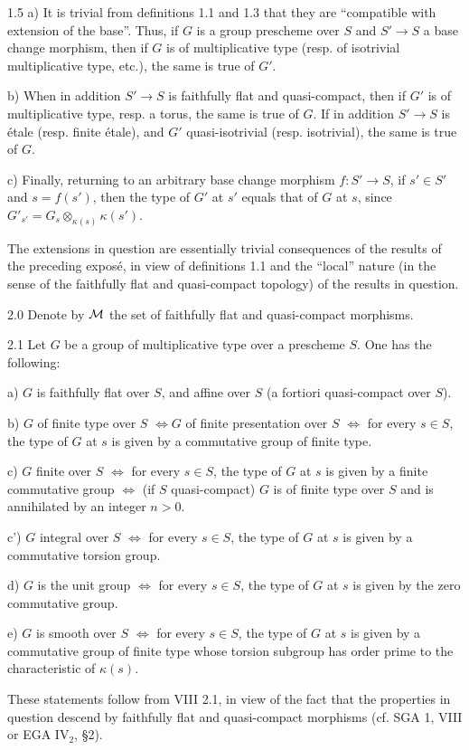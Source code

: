 \begin{remark}{1.5}\label{IX.1.5}
a) It is trivial from definitions 1.1 and 1.3 that they are ``compatible with extension of the base''. Thus, if $G$ is a group prescheme over $S$ and $S'\to S$ a base change morphism, then if $G$ is of multiplicative type (resp. of isotrivial multiplicative type, etc.), the same is true of $G'$.

b) When in addition $S'\to S$ is faithfully flat and quasi-compact, then if $G'$ is of multiplicative type, resp. a torus, the same is true of $G$. If in addition $S'\to S$ is étale (resp. finite étale), and $G'$ quasi-isotrivial (resp. isotrivial), the same is true of $G$.

c) Finally, returning to an arbitrary base change morphism $f:S'\to S$, if $s'\in S'$ and $s=f(s')$, then the type of $G'$ at $s'$ equals that of $G$ at $s$, since $G'_{s'}=G_s\otimes_{\kappa(s)}\kappa(s')$.
\end{remark}

The extensions in question are essentially trivial consequences of the results of the preceding expos\'e, in view of definitions 1.1 and the ``local'' nature (in the sense of the faithfully flat and quasi-compact topology) of the results in question.
\begin{definition}{2.0}\label{IX.2.0}
 Denote by $\cal M$ the set of faithfully flat and quasi-compact morphisms.
\end{definition}
\begin{proposition}{2.1}\label{IX.2.1}
Let $G$ be a group of multiplicative type over a prescheme $S$. One has the following:

a) $G$ is faithfully flat over $S$, and affine over $S$ (a fortiori quasi-compact over $S$).

b) $G$ of finite type over $S$ $\Longleftrightarrow G$ of finite presentation over $S$ $\Longleftrightarrow$ for every $s\in S$, the type of $G$ at $s$ is given by a commutative group of finite type.

c) $G$ finite over $S$ $\Longleftrightarrow$ for every $s\in S$, the type of $G$ at $s$ is given by a finite commutative group $\Longleftrightarrow$ (if $S$ quasi-compact) $G$ is of finite type over $S$ and is annihilated by an integer $n>0$.

c') $G$ integral over $S$ $\Longleftrightarrow$ for every $s\in S$, the type of $G$ at $s$ is given by a commutative torsion group.

d) $G$ is the unit group $\Longleftrightarrow$ for every $s\in S$, the type of $G$ at $s$ is given by the zero commutative group.

e) $G$ is smooth over $S$ $\Longleftrightarrow$ for every $s\in S$, the type of $G$ at $s$ is given by a commutative group of finite type whose torsion subgroup has order prime to the characteristic of $\kappa(s)$.
\end{proposition}
These statements follow from VIII 2.1, in view of the fact that the properties in question descend by faithfully flat and quasi-compact morphisms (cf. SGA 1, VIII or EGA IV$_2$, \S2).

